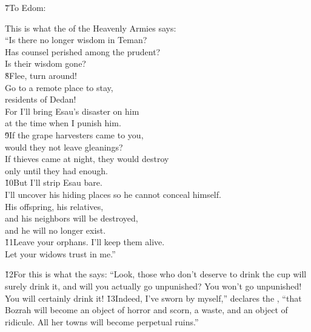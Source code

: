 \v{7}To Edom:

\begin{poetry}
\poeml This is what the  of the Heavenly Armies says: \\
\poemll    ``Is there no longer wisdom in Teman? \\
\poeml Has counsel perished among the prudent? \\
\poemll    Is their wisdom gone? \\
\poeml \v{8}Flee, turn around! \\
\poemll    Go to a remote place to stay, \\
\poeml residents of Dedan! \\
\poemll    For I'll bring Esau's disaster on him \\
\poemll    at the time when I punish him. \\
\poeml \v{9}If the grape harvesters came to you, \\
\poemll    would they not leave gleanings? \\
\poeml If thieves came at night, they would destroy \\
\poemll    only until they had enough. \\
\poeml \v{10}But I'll strip Esau bare. \\
\poemll    I'll uncover his hiding places so he cannot conceal himself. \\
\poeml His offspring, his relatives, \\
\poemll    and his neighbors will be destroyed, \\
\poemlll       and he will no longer exist. \\
\poeml \v{11}Leave your orphans. I'll keep them alive. \\
\poemll    Let your widows trust in me.''
\end{poetry}

\v{12}For this is what the  says: ``Look, those who don't deserve to drink the cup will surely drink it, and will you actually go unpunished? You won't go unpunished! You will certainly drink it! \v{13}Indeed, I've sworn by myself,'' declares the , ``that Bozrah will become an object of horror and scorn, a waste, and an object of ridicule. All her towns will become perpetual ruins.''

